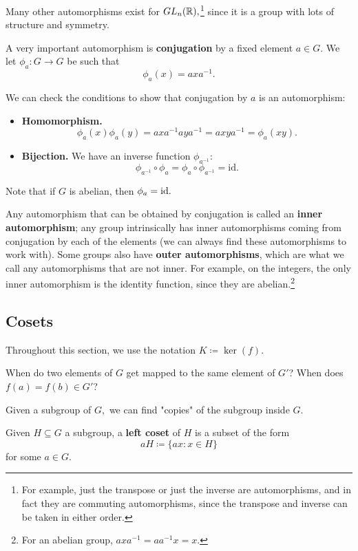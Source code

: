 Many other automorphisms exist for $GL_n(\mathbb R),$\footnote{For example, just the transpose or just the inverse are automorphisms, and in fact they are commuting automorphisms, since the transpose and inverse can be taken in either order.} since it is a group with lots of structure and symmetry. 

\begin{example}[Conjugation]
A very important automorphism is \textbf{conjugation} by a fixed element $a \in G.$ We let $\phi_a: G \rightarrow G$ be such that
\[
\phi_a(x) = axa^{-1}.
\]

We can check the conditions to show that conjugation by $a$ is an automorphism:
\begin{itemize}
    \item \textbf{Homomorphism.} \[
    \phi_a(x)\phi_a(y) = axa^{-1}aya^{-1} = axya^{-1} = \phi_a(xy).
    \]
    \item \textbf{Bijection.} We have an inverse function $\phi_{a^{-1}}$: 
    \[
    \phi_{a^{-1}} \circ \phi_{a} = \phi_{a} \circ \phi_{a^{-1}} = \text{id}.
    \]
\end{itemize}
\end{example} 

Note that if $G$ is abelian, then $\phi_a = \text{id}.$

Any automorphism that can be obtained by conjugation is called an \textbf{inner automorphism}; any group intrinsically has inner automorphisms coming from conjugation by each of the elements (we can always find these automorphisms to work with). Some groups also have \textbf{outer automorphisms}, which are what we call any automorphisms that are not inner. For example, on the integers, the only inner automorphism is the identity function, since they are abelian.\footnote{For an abelian group, $axa^{-1} = aa^{-1}x = x$.}

\subsection{Cosets}

Throughout this section, we use the notation $K \coloneqq \ker(f)$.

\begin{qq}
When do two elements of $G$ get mapped to the same element of $G'$? When does $f(a) = f(b) \in G'$?

\end{qq}

Given a subgroup of $G,$ we can find "copies" of the subgroup inside $G.$
\begin{definition}
Given $H \subseteq G$ a subgroup, a \textbf{left coset} of $H$ is a subset of the form \[aH \coloneqq \{ax : x \in H\}\] for some $a \in G$.
\end{definition}

